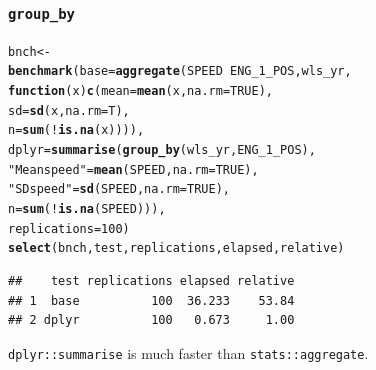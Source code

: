\documentclass{beamer}\usepackage[]{graphicx}\usepackage[]{color}
\makeatletter
\newcommand{\hlnum}[1]{\textcolor[rgb]{0.686,0.059,0.569}{#1}}%
\newcommand{\hlstr}[1]{\textcolor[rgb]{0.192,0.494,0.8}{#1}}%
\newcommand{\hlopt}[1]{\textcolor[rgb]{0,0,0}{#1}}%
\newcommand{\hlstd}[1]{\textcolor[rgb]{0.345,0.345,0.345}{#1}}%
\newcommand{\hlkwa}[1]{\textcolor[rgb]{0.161,0.373,0.58}{\textbf{#1}}}%
\newcommand{\hlkwb}[1]{\textcolor[rgb]{0.69,0.353,0.396}{#1}}%
\newcommand{\hlkwc}[1]{\textcolor[rgb]{0.333,0.667,0.333}{#1}}%
\newcommand{\hlkwd}[1]{\textcolor[rgb]{0.737,0.353,0.396}{\textbf{#1}}}%
\newenvironment{kframe}{%
 \def\at@end@of@kframe{}%
 \ifinner\ifhmode%
  \def\at@end@of@kframe{\end{minipage}}%
  \begin{minipage}{\columnwidth}%
 \fi\fi%
 \def\FrameCommand##1{\hskip\@totalleftmargin \hskip-\fboxsep
 \colorbox{shadecolor}{##1}\hskip-\fboxsep
     \hskip-\linewidth \hskip-\@totalleftmargin \hskip\columnwidth}%
 \MakeFramed {\advance\hsize-\width
   \@totalleftmargin\z@ \linewidth\hsize
   \@setminipage}}%
 {\par\unskip\endMakeFramed%
 \at@end@of@kframe}
\newenvironment{knitrout}{}{} %
\makeatother
\begin{document}
\begin{frame}[fragile]
  \frametitle{{\tt group\_by}}
\begin{knitrout}\footnotesize
{}\color{fgcolor}\begin{kframe}
\begin{alltt}
\hlstd{bnch} \hlkwb{<-}
  \hlkwd{benchmark}\hlstd{(}\hlkwc{base} \hlstd{=} \hlkwd{aggregate}\hlstd{(SPEED} \hlopt{~} \hlstd{ENG_1_POS, wls_yr,}
                             \hlkwa{function}\hlstd{(}\hlkwc{x}\hlstd{)} \hlkwd{c}\hlstd{(}\hlkwc{mean} \hlstd{=} \hlkwd{mean}\hlstd{(x,} \hlkwc{na.rm} \hlstd{=} \hlnum{TRUE}\hlstd{),}
                                           \hlkwc{sd}   \hlstd{=} \hlkwd{sd}\hlstd{(x,} \hlkwc{na.rm} \hlstd{= T),}
                                           \hlkwc{n}    \hlstd{=} \hlkwd{sum}\hlstd{(}\hlopt{!}\hlkwd{is.na}\hlstd{(x)))),}
            \hlkwc{dplyr} \hlstd{=} \hlkwd{summarise}\hlstd{(}\hlkwd{group_by}\hlstd{(wls_yr, ENG_1_POS),}
                              \hlstr{"Mean speed"} \hlstd{=} \hlkwd{mean}\hlstd{(SPEED,} \hlkwc{na.rm} \hlstd{=} \hlnum{TRUE}\hlstd{),}
                              \hlstr{"SD speed"}   \hlstd{=} \hlkwd{sd}\hlstd{(SPEED,} \hlkwc{na.rm} \hlstd{=} \hlnum{TRUE}\hlstd{),}
                              \hlkwc{n}            \hlstd{=} \hlkwd{sum}\hlstd{(}\hlopt{!}\hlkwd{is.na}\hlstd{(SPEED))),}
            \hlkwc{replications} \hlstd{=} \hlnum{100}\hlstd{)}
\hlkwd{select}\hlstd{(bnch, test, replications, elapsed, relative)}
\end{alltt}
\begin{verbatim}
##    test replications elapsed relative
## 1  base          100  36.233    53.84
## 2 dplyr          100   0.673     1.00
\end{verbatim}
\end{kframe}
\end{knitrout}
  {\tt dplyr::summarise} is much faster than {\tt stats::aggregate}.
\end{frame} 
\end{document}

